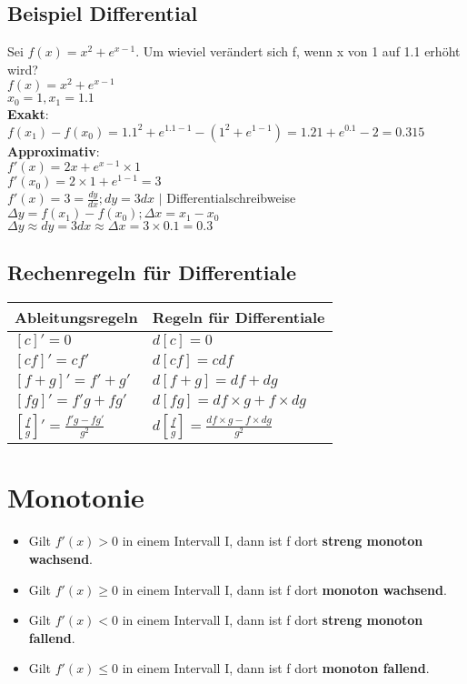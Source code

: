 \documentclass[../main.tex]{subfiles}
\begin{document}
\subsection{Beispiel Differential}
Sei $f(x) = x^2 + e^{x-1}$. Um wieviel verändert sich f, wenn x von 1 auf 1.1 erhöht wird? \\
$f(x) = x^2 + e^{x-1}$ \\
$x_0 = 1, x_1 = 1.1$ \\ [7pt]
\textbf{Exakt}: \\ [7pt]
$f(x_1) - f(x_0) = 1.1^2 + e^{1.1-1} - (1^2 + e^{1-1})= 1.21 + e^0.1 - 2 = 0.315$ \\ [7pt]
\textbf{Approximativ}: \\ [7pt]
$f'(x) = 2x + e^{x-1} \times 1$ \\ [7pt]
$f'(x_0) = 2 \times 1 + e^{1-1} = 3$ \\ [7pt]
$f'(x) = 3 = \frac{dy}{dx}; dy = 3dx$ $|$ Differentialschreibweise \\ [7pt]
$\Delta y = f(x_1) - f(x_0); \Delta x = x_1 - x_0$ \\ [7pt]
$\Delta y \approx dy = 3dx \approx \Delta x = 3 \times 0.1 = 0.3$

\subsection{Rechenregeln für Differentiale}
\begin{tabularx}{0.8\textwidth} { 
    >{\centering\arraybackslash}X 
    >{\centering\arraybackslash}X  }
    \hline
    Ableitungsregeln & Regeln für Differentiale \\ [7pt]
    \hline
    $[c]' = 0$ & $d[c] = 0$
    \\ [7pt]
    $[cf]' = cf'$ & $d[cf] = cdf$
    \\ [7pt]
    $[f + g]' = f' + g'$ & $d[f+g] = df +dg$
    \\ [7pt]
    $[fg]' = f'g + fg'$ & $d[fg] = df \times g +f \times dg$
    \\ [7pt]
    $[\frac{f}{g}]' = \frac{f'g - fg'}{g^2}$ & $d[\frac{f}{g}] = \frac{df \times g - f \times dg}{g^2}$
\end{tabularx}

\section{Monotonie}
\begin{itemize}
    \item Gilt $f'(x) > 0$ in einem Intervall I, dann ist f dort \textbf{streng monoton wachsend}.
    \item Gilt $f'(x) \geq 0$ in einem Intervall I, dann ist f dort \textbf{monoton wachsend}.
    \item Gilt $f'(x) < 0$ in einem Intervall I, dann ist f dort \textbf{streng monoton fallend}.
    \item Gilt $f'(x) \leq 0$ in einem Intervall I, dann ist f dort \textbf{monoton fallend}.
\end{itemize}
\end{document}
